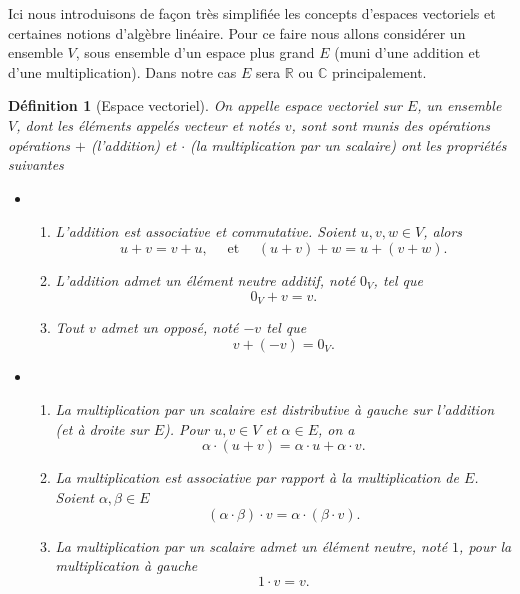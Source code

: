 \documentclass[a4paper,12pt]{book}
\newcommand{\real}{\mathbb{R}}
\newcommand{\complex}{\mathbb{C}}
\newtheorem{definition}{Définition}
\begin{document}
Ici nous introduisons de façon très simplifiée les concepts d'espaces vectoriels et certaines notions
d'algèbre linéaire. Pour ce faire nous allons considérer un ensemble $V$, sous ensemble d'un espace plus grand $E$ (muni d'une addition et d'une multiplication). 
Dans notre cas $E$ sera $\real$ ou $\complex$ principalement. 
\begin{definition}[Espace vectoriel]
 On appelle espace vectoriel sur $E$, un ensemble $V$, dont les éléments appelés vecteur et notés $v$, sont 
 sont munis des opérations opérations $+$ (l'addition) et $\cdot$ (la multiplication par un scalaire) ont les propriétés suivantes
 \pagebreak
 \begin{itemize}
  \item[$+$:$V\times V\rightarrow V$]\ \hfill\break
  \begin{enumerate}
  \item L'addition est associative et commutative. Soient $u,v,w\in V$, alors
  \begin{equation}
  u+v=v+u,\quad \mbox{ et }\quad (u+v)+w=u+(v+w).
  \end{equation}
  \item L'addition admet un élément neutre additif, noté $0_V$, tel que
  \begin{equation}
  0_V+v=v.
  \end{equation}
  \item Tout $v$ admet un opposé, noté $-v$ tel que
  \begin{equation}
  v+(-v)=0_V.
  \end{equation}
  \end{enumerate}
  \item[$\cdot$:$E\times V\rightarrow V$] \ \hfill\break
  \begin{enumerate}
  \item La multiplication par un scalaire est distributive à gauche sur l'addition (et à droite sur $E$). 
  Pour $u,v\in V$ et $\alpha\in E$, on a 
  \begin{equation}
  \alpha\cdot(u+v)=\alpha\cdot u+\alpha\cdot v.
  \end{equation}
  \item La multiplication est associative par rapport à la multiplication de $E$. Soient $\alpha,\beta\in E$ 
  \begin{equation}
   (\alpha\cdot\beta)\cdot v=\alpha\cdot(\beta\cdot v).
  \end{equation}
  \item La multiplication par un scalaire admet un élément neutre, noté $1$, pour la multiplication à gauche
  \begin{equation}
   1 \cdot v=v.
  \end{equation}
  \end{enumerate}
 \end{itemize}
\end{definition}
\end{document}

